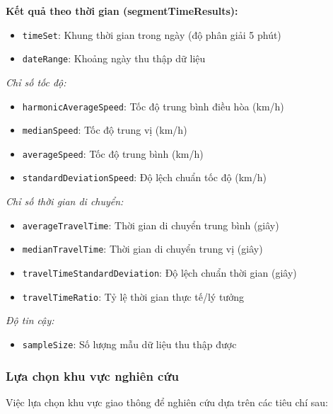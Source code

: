 \textbf{Kết quả theo thời gian (segmentTimeResults):}
\begin{itemize}
    \item \texttt{timeSet}: Khung thời gian trong ngày (độ phân giải 5 phút)
    \item \texttt{dateRange}: Khoảng ngày thu thập dữ liệu
\end{itemize}

\textit{Chỉ số tốc độ:}
\begin{itemize}
    \item \texttt{harmonicAverageSpeed}: Tốc độ trung bình điều hòa (km/h)
    \item \texttt{medianSpeed}: Tốc độ trung vị (km/h)
    \item \texttt{averageSpeed}: Tốc độ trung bình (km/h)
    \item \texttt{standardDeviationSpeed}: Độ lệch chuẩn tốc độ (km/h)
\end{itemize}

\textit{Chỉ số thời gian di chuyển:}
\begin{itemize}
    \item \texttt{averageTravelTime}: Thời gian di chuyển trung bình (giây)
    \item \texttt{medianTravelTime}: Thời gian di chuyển trung vị (giây)
    \item \texttt{travelTimeStandardDeviation}: Độ lệch chuẩn thời gian (giây)
    \item \texttt{travelTimeRatio}: Tỷ lệ thời gian thực tế/lý tưởng
\end{itemize}

\textit{Độ tin cậy:}
\begin{itemize}
    \item \texttt{sampleSize}: Số lượng mẫu dữ liệu thu thập được
\end{itemize}

\subsubsection{Lựa chọn khu vực nghiên cứu}


Việc lựa chọn khu vực giao thông để nghiên cứu dựa trên các tiêu chí sau:

